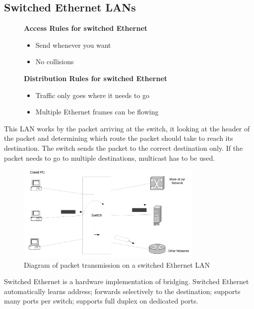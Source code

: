 \subsection*{Switched Ethernet LANs}
\begin{figure}[H]
    \begin{minipage}[t]{0.45\textwidth}
        \textbf{Access Rules for switched Ethernet}
        \begin{itemize}
            \item Send whenever you want
            \item No collisions
        \end{itemize}
    \end{minipage}\hfill
    \begin{minipage}[t]{0.45\textwidth}
        \textbf{Distribution Rules for switched Ethernet}
        \begin{itemize}
            \item Traffic only goes where it needs to go
            \item Multiple Ethernet frames can be flowing
        \end{itemize}
    \end{minipage}\hfill
\end{figure}
This LAN works by the packet arriving at the switch, it looking at the header of the packet and determining which route the packet should take to reach its destination. The switch sends the packet to the correct destination only. If the packet needs to go to multiple destinations, multicast has to be used. 
\begin{figure}[H]
    \centering
    \includegraphics[width=0.8\textwidth]{assets/access-distro-switched-ethernet.png}
    \caption{Diagram of packet transmission on a switched Ethernet LAN}
\end{figure}
Switched Ethernet is a hardware implementation of bridging. Switched Ethernet automatically learns  address; forwards selectively to the destination; supports many ports per switch; supports full duplex on dedicated ports. 

